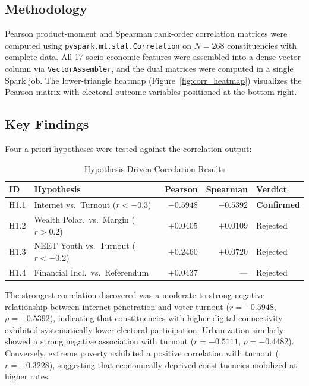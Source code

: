 \documentclass[12pt, a4paper]{article}
\begin{document}
\subsection{Methodology}
Pearson product-moment and Spearman rank-order correlation matrices were computed using \texttt{pyspark.ml.stat.Correlation} on $N = 268$ constituencies with complete data. All 17 socio-economic features were assembled into a dense vector column via \texttt{VectorAssembler}, and the dual matrices were computed in a single Spark job. The lower-triangle heatmap (Figure~\ref{fig:corr_heatmap}) visualizes the Pearson matrix with electoral outcome variables positioned at the bottom-right.

\subsection{Key Findings}

Four a priori hypotheses were tested against the correlation output:

\begin{table}[H]
\centering
\caption{Hypothesis-Driven Correlation Results}
\label{tab:corr_hyp}
\small
\begin{tabular}{l l r r l}
\toprule
\textbf{ID} & \textbf{Hypothesis} & \textbf{Pearson} & \textbf{Spearman} & \textbf{Verdict} \\
\midrule
H1.1 & Internet vs.\ Turnout ($r < -0.3$) & $-0.5948$ & $-0.5392$ & \textbf{Confirmed} \\
H1.2 & Wealth Polar.\ vs.\ Margin ($r > 0.2$) & $+0.0405$ & $+0.0109$ & Rejected \\
H1.3 & NEET Youth vs.\ Turnout ($r < -0.2$) & $+0.2460$ & $+0.0720$ & Rejected \\
H1.4 & Financial Incl.\ vs.\ Referendum & $+0.0437$ & --- & Rejected \\
\bottomrule
\end{tabular}
\end{table}

The strongest correlation discovered was a moderate-to-strong negative relationship between internet penetration and voter turnout ($r = -0.5948$, $\rho = -0.5392$), indicating that constituencies with higher digital connectivity exhibited systematically lower electoral participation. Urbanization similarly showed a strong negative association with turnout ($r = -0.5111$, $\rho = -0.4482$). Conversely, extreme poverty exhibited a positive correlation with turnout ($r = +0.3228$), suggesting that economically deprived constituencies mobilized at higher rates.
\end{document}
